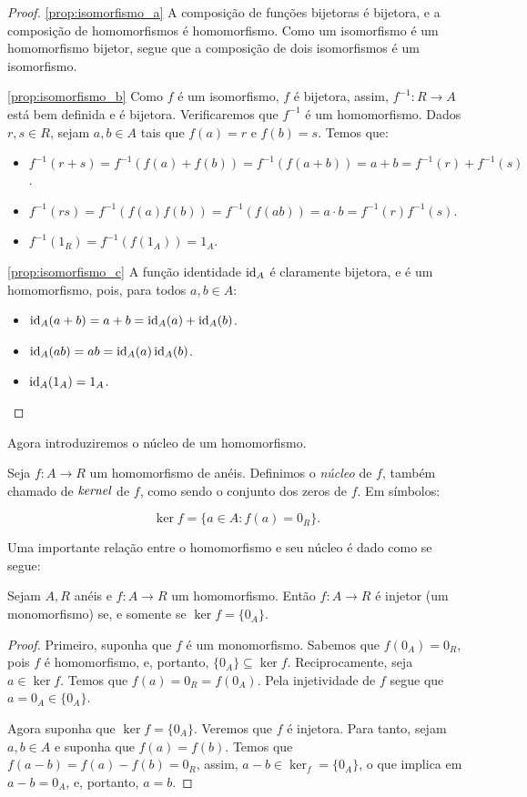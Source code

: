 \begin{proof}
\ref{prop:isomorfismo_a} A composição de funções bijetoras é bijetora, e a composição de homomorfismos é homomorfismo.
Como um isomorfismo é um homomorfismo bijetor, segue que a composição de dois isomorfismos é um isomorfismo.

\ref{prop:isomorfismo_b} Como $f$ é um isomorfismo, $f$ é bijetora, assim, $f^{-1}:R\rightarrow A$ está bem definida e é bijetora. Verificaremos que $f^{-1}$ é um homomorfismo. Dados $r, s \in R$, sejam $a, b \in A$ tais que $f(a)=r$ e $f(b)=s$. Temos que:
\begin{itemize}
    \item $f^{-1}(r+s)=f^{-1}(f(a)+f(b))=f^{-1}(f(a+b))=a+b=f^{-1}(r)+f^{-1}(s)$.
    \item $f^{-1}(rs)=f^{-1}(f(a)f(b))=f^{-1}(f(ab))=a\cdot b=f^{-1}(r)f^{-1}(s)$.
    \item $f^{-1}(1_R)=f^{-1}(f(1_A))=1_A$.
\end{itemize}

\ref{prop:isomorfismo_c} A função identidade $\operatorname{id}_A$ é claramente bijetora, e é um homomorfismo, pois, para todos $a, b \in A$:
    \begin{itemize}
        \item $\operatorname{id}_A(a+b)=a+b=\operatorname{id}_A(a)+\operatorname{id}_A(b)$.
        \item $\operatorname{id}_A(ab)=ab=\operatorname{id}_A(a)\operatorname{id}_A(b)$.
        \item $\operatorname{id}_A(1_A)=1_A$.
    \end{itemize}
\end{proof}

Agora introduziremos o núcleo de um homomorfismo.
\begin{definition}
    Seja $f: A\rightarrow R$ um homomorfismo de anéis.
    Definimos o \emph{núcleo} de $f$, também chamado de $\emph{kernel}$ de $f$, como sendo o conjunto dos zeros de $f$.
    Em símbolos:

    \[\ker f=\{a \in A: f(a)=0_R\}.\]
\end{definition}
Uma importante relação entre o homomorfismo e seu núcleo é dado como se segue:

\begin{prop}
Sejam $A, R$ anéis e $f:A\rightarrow R$ um homomorfismo. Então $f:A\rightarrow R$ é injetor (um monomorfismo) se, e somente se $\ker f = \{0_A\}$.
\end{prop}

\begin{proof}
    Primeiro, suponha que $f$ é um monomorfismo.
    Sabemos que $f(0_A)=0_R$, pois $f$ é homomorfismo, e, portanto, $\{0_A\}\subseteq \ker f$.
    Reciprocamente, seja $a \in \ker f$.
    Temos que $f(a)=0_R=f(0_A)$. Pela injetividade de $f$ segue que $a=0_A\in \{0_A\}$.

    Agora suponha que $\ker f=\{0_A\}$.
    Veremos que $f$ é injetora.
    Para tanto, sejam $a, b \in A$ e suponha que $f(a)=f(b)$.
    Temos que $f(a-b)=f(a)-f(b)=0_R$, assim, $a-b\in \ker_f = \{0_A\}$, o que implica em $a-b=0_A$, e, portanto, $a=b$.
\end{proof}
